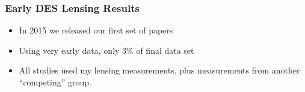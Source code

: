 \documentclass{beamer}
\begin{document}
\frame
{

    \frametitle{Early DES Lensing Results}
 
 
    \begin{itemize}

        \item In 2015 we released our first set of papers

        \item Using very early data, only 3\% of final data set

        \item All studies used my lensing measurements, plus measurements
            from another ``competing'' group.

    \end{itemize}

}
\end{document}
